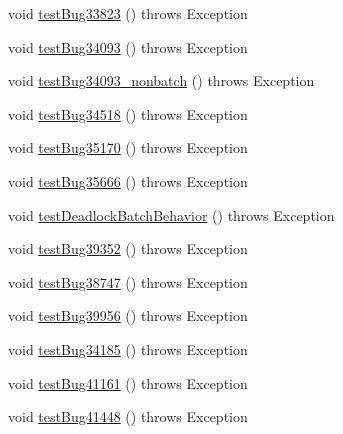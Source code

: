 \begin{DoxyCompactItemize}
\item 
void \mbox{\hyperlink{classtestsuite_1_1regression_1_1_statement_regression_test_a5d8cd5c61277cdedeb6ba9bb4626f26e}{test\+Bug33823}} ()  throws Exception 
\item 
void \mbox{\hyperlink{classtestsuite_1_1regression_1_1_statement_regression_test_accd5c83c1b95ec64b7d7868f9ea2be99}{test\+Bug34093}} ()  throws Exception 
\item 
void \mbox{\hyperlink{classtestsuite_1_1regression_1_1_statement_regression_test_a4da5d0486fdf95888cc7b48416651a78}{test\+Bug34093\+\_\+nonbatch}} ()  throws Exception 
\item 
void \mbox{\hyperlink{classtestsuite_1_1regression_1_1_statement_regression_test_aaf166039a528b9c7a67cedd9ac1e3ea5}{test\+Bug34518}} ()  throws Exception 
\item 
void \mbox{\hyperlink{classtestsuite_1_1regression_1_1_statement_regression_test_a77f152c1a0a6a13301fc5eb5645fd70f}{test\+Bug35170}} ()  throws Exception 
\item 
void \mbox{\hyperlink{classtestsuite_1_1regression_1_1_statement_regression_test_ae6669fb30d9e776b85809dd115147654}{test\+Bug35666}} ()  throws Exception 
\item 
void \mbox{\hyperlink{classtestsuite_1_1regression_1_1_statement_regression_test_ad4c2f607c1e7faa7020565acc41d35e4}{test\+Deadlock\+Batch\+Behavior}} ()  throws Exception 
\item 
void \mbox{\hyperlink{classtestsuite_1_1regression_1_1_statement_regression_test_a86fcff3fb5858bcc587fdca1c9792c73}{test\+Bug39352}} ()  throws Exception 
\item 
void \mbox{\hyperlink{classtestsuite_1_1regression_1_1_statement_regression_test_a86bf013036eca2c9f95ac43bf1e140c4}{test\+Bug38747}} ()  throws Exception 
\item 
void \mbox{\hyperlink{classtestsuite_1_1regression_1_1_statement_regression_test_a18eb4ae43335fd9ce03f68f676580175}{test\+Bug39956}} ()  throws Exception 
\item 
void \mbox{\hyperlink{classtestsuite_1_1regression_1_1_statement_regression_test_a15c0e8d8655abcb27daec70120313cc5}{test\+Bug34185}} ()  throws Exception 
\item 
void \mbox{\hyperlink{classtestsuite_1_1regression_1_1_statement_regression_test_a5203eb66a2459e2aca1ef7e8b17f23e8}{test\+Bug41161}} ()  throws Exception 
\item 
void \mbox{\hyperlink{classtestsuite_1_1regression_1_1_statement_regression_test_ab774e215dfc6ff4840c43c20d00a90dd}{test\+Bug41448}} ()  throws Exception 

\end{DoxyCompactItemize}
